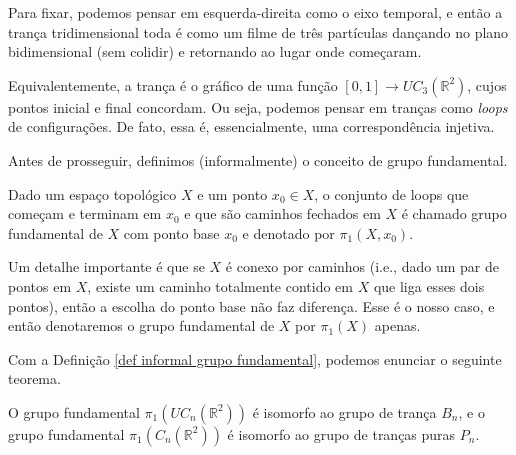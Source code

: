 	\par\vspace{0.3cm} Para fixar, podemos pensar em esquerda-direita como o eixo temporal, e então a trança tridimensional toda é como um filme de três partículas dançando no plano bidimensional (sem colidir) e retornando ao lugar onde começaram.
	\par\vspace{0.3cm} Equivalentemente, a trança é o gráfico de uma função $[0,1]\to UC_3(\mathbb{R}^2)$, cujos pontos inicial e final concordam. Ou seja, podemos pensar em tranças como \textit{loops} de configurações. De fato, essa é, essencialmente, uma correspondência injetiva.
	\par\vspace{0.3cm} Antes de prosseguir, definimos (informalmente) o conceito de grupo fundamental.
	
	\begin{deff}
		\label{def informal grupo fundamental}
		Dado um espaço topológico $X$ e um ponto $x_0\in X$, o conjunto de loops que começam e terminam em $x_0$ e que são caminhos fechados em $X$ é chamado grupo fundamental de $X$ com ponto base $x_0$ e denotado por $\pi_1(X,x_0)$.
	\end{deff}
	
	\par\vspace{0.3cm} Um detalhe importante é que se $X$ é conexo por caminhos (i.e., dado um par de pontos em $X$, existe um caminho totalmente contido em $X$ que liga esses dois pontos), então a escolha do ponto base não faz diferença. Esse é o nosso caso, e então denotaremos o grupo fundamental de $X$ por $\pi_1(X)$ apenas.
	\par\vspace{0.3cm} Com a Definição \eqref{def informal grupo fundamental}, podemos enunciar o seguinte teorema.
	
	\begin{theorem}
		\label{grupo fundamental de tranca}
		O grupo fundamental $\pi_1(UC_n(\mathbb{R}^2))$ é isomorfo ao grupo de trança $B_n$, e o grupo fundamental $\pi_1(C_n(\mathbb{R}^2))$ é isomorfo ao grupo de tranças puras $P_n$.
	\end{theorem} 
	
